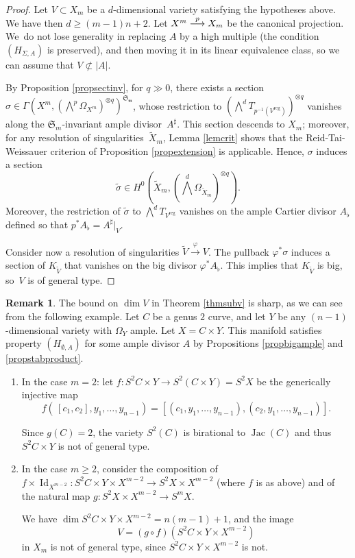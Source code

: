 \documentclass[JEP,XML,SOM,Unicode, NoEqCountersInSection,NoFloatCountersInSection,published]{cedram}
\def\To#1{\mathchoice{\xrightarrow{\textstyle\kern4pt#1\kern3pt}}{\stackrel{#1}{\longrightarrow}}{}{}}
\newcommand{\reg}{\mathrm{reg}}
\DeclareMathOperator{\Id}{Id}
\DeclareMathOperator{\Jac}{Jac}
\theoremstyle{theorem}
\theoremstyle{definition}
\newtheorem{remark}[proposition]{Remark}
\begin{document}
\begin{proof}
Let $V \subset X_m$ be a $d$-dimensional variety satisfying the hypotheses above. We have then $d \geq (m-1)n + 2$. Let $X^m \To{p} X_m$ be the canonical projection. We~do not lose generality in replacing $A$ by a high multiple (the condition $(H_{\Sigma, A})$ is preserved), and then moving it in its linear equivalence class, so we can assume that $V \not\subset |A|$.

By Proposition \ref{propsectinv}, for $q \gg 0$, there exists a section $\sigma \in \Gamma( X^m, (\bigwedge^p \Omega_{X^m})^{\otimes q})^{\mathfrak{S_m}}$, whose restriction to $(\bigwedge^{d} T_{p^{-1}(V^\reg)})^{\otimes q}$ vanishes along the $\mathfrak{S}_m$-invariant ample divisor~$A^\sharp$. This section descends to $X_m$; moreover, for any resolution of singularities~$\widetilde{X}_m$, Lemma \ref{lemcrit} shows that the Reid-Tai-Weissauer criterion of Proposition \ref{propextension} is applicable. Hence, $\sigma$ induces a section
\[
\widetilde{\sigma} \in H^0 (\widetilde{X}_m, (\bigwedge^d \Omega_{\widetilde{X}_m})^{\otimes q}).
\]
Moreover, the restriction of $\widetilde{\sigma}$ to $\bigwedge^{d} T_{V^\reg}$ vanishes on the ample Cartier divisor \(A_{\flat}\) defined so that \(p^\ast A_\flat = A^{\sharp}|_{V}\).

Consider now a resolution of singularities $\widetilde{V} \overset{\varphi}{\to} V$. The pullback $\varphi^\ast \sigma$ induces a section of $K_{\widetilde{V}}$ that vanishes on the big divisor $\varphi^\ast A_{\flat}$. This implies that $K_{\widetilde{V}}$ is big, so~$V$ is of general type.
\end{proof}

\begin{remark}
The bound on $\dim V$ in Theorem \ref{thmsubv} is sharp, as we can see from the following example. Let $C$ be a genus $2$ curve, and let $Y$ be any $(n-1)$-dimensional variety with $\Omega_Y$ ample. Let $X = C \times Y$. This manifold satisfies property $(H_{\emptyset, A})$ for some ample divisor $A$ by Propositions \ref{propbigample} and \ref{propstabproduct}.
\begin{enumerate}
\item In the case $m = 2$: let $f : S^2 C \times Y \to S^2 (C \times Y) =S^2 X$ be the generically injective map
\[
f( \, [c_1, c_2], y_1,\dots, y_{n-1}) = [(c_1, y_1,\dots, y_{n-1}), (c_2, y_1,\dots, y_{n-1})].
\]

Since $g(C) = 2$, the variety $S^2(C)$ is birational to $\Jac(C)$ and thus $S^2 C \times Y$ is not of general type.

\item In the case $m \geq 2$, consider the composition of $f \times \Id_{X^{m-2}}: S^2 C \times Y \times X^{m-2} \to S^2 X \times X^{m-2}$ (where $f$ is as above) and of the natural map $g : S^2 X \times X^{m-2} \to S^m X$.

We have $\dim S^2 C \times Y \times X^{m-2} = n(m-1) + 1$, and the image
\[
V = (g \circ f)(S^2 C \times Y \times X^{m-2})
\]
in $X_m$ is not of general type, since $S^2 C \times Y \times X^{m-2}$ is not.
\end{enumerate}

\end{remark}
\end{document}
